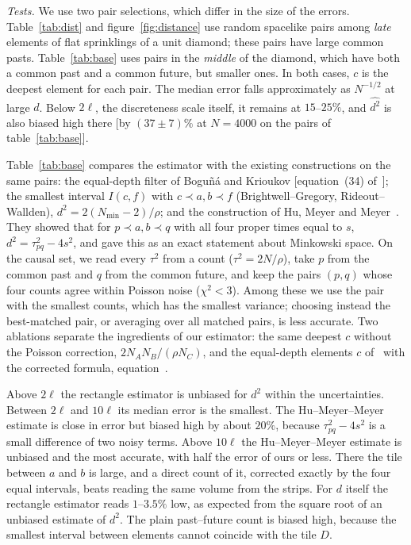 \documentclass[12pt]{iopart}
\begin{document}
\emph{Tests.} We use two pair selections, which differ in the size of the errors. Table~\ref{tab:dist} and figure~\ref{fig:distance} use random spacelike pairs among \emph{late} elements of flat sprinklings of a unit diamond; these pairs have large common pasts. Table~\ref{tab:base} uses pairs in the \emph{middle} of the diamond, which have both a common past and a common future, but smaller ones. In both cases, $c$ is the deepest element for each pair. The median error falls approximately as $N^{-1/2}$ at large $d$. Below $2\ell$, the discreteness scale itself, it remains at $15$--$25\%$, and $\widehat{d^2}$ is also biased high there [by $(37\pm7)\%$ at $N=4000$ on the pairs of table~\ref{tab:base}].

Table~\ref{tab:base} compares the estimator with the existing constructions on the same pairs: the equal-depth filter of Bogu\~n\'a and Krioukov [equation~(34) of~\cite{BK24}]; the smallest interval $I(c,f)$ with $c\prec a,b\prec f$ (Brightwell--Gregory, Rideout--Wallden), $d^2=2(N_{\min}-2)/\rho$; and the construction of Hu, Meyer and Meyer~\cite{HMM25}. They showed that for $p\prec a,b\prec q$ with all four proper times equal to $s$, $d^2=\tau_{pq}^2-4s^2$, and gave this as an exact statement about Minkowski space. On the causal set, we read every $\tau^2$ from a count ($\tau^2=2N/\rho$), take $p$ from the common past and $q$ from the common future, and keep the pairs $(p,q)$ whose four counts agree within Poisson noise ($\chi^2<3$). Among these we use the pair with the smallest counts, which has the smallest variance; choosing instead the best-matched pair, or averaging over all matched pairs, is less accurate. Two ablations separate the ingredients of our estimator: the same deepest $c$ without the Poisson correction, $2N_AN_B/(\rho N_C)$, and the equal-depth elements $c$ of~\cite{BK24} with the corrected formula, equation~.

Above $2\ell$ the rectangle estimator is unbiased for $d^2$ within the uncertainties. Between $2\ell$ and $10\ell$ its median error is the smallest. The Hu--Meyer--Meyer estimate is close in error but biased high by about $20\%$, because $\tau_{pq}^2-4s^2$ is a small difference of two noisy terms. Above $10\ell$ the Hu--Meyer--Meyer estimate is unbiased and the most accurate, with half the error of ours or less. There the tile between $a$ and $b$ is large, and a direct count of it, corrected exactly by the four equal intervals, beats reading the same volume from the strips. For $d$ itself the rectangle estimator reads $1$--$3.5\%$ low, as expected from the square root of an unbiased estimate of $d^2$. The plain past--future count is biased high, because the smallest interval between elements cannot coincide with the tile $D$.
\end{document}
